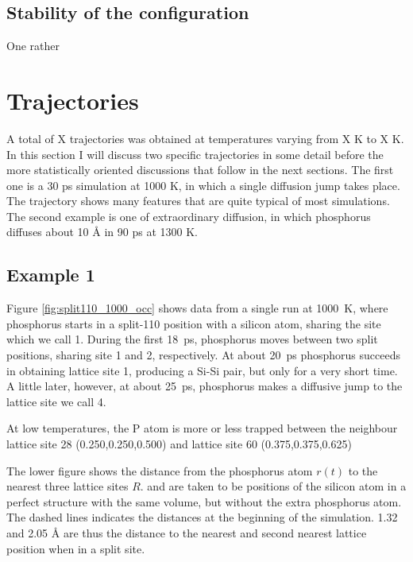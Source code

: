 \documentclass[11pt,bibliography=totoc,index=totoc]{scrbook}   %
\begin{document}
\subsection{Stability of the  configuration}

One rather 




\section{Trajectories}



A total of X trajectories was obtained at temperatures varying from X K to X K. 
In this section I will discuss two specific trajectories in some detail before the more statistically oriented discussions that follow in the next sections.
The first one is a 30 ps simulation at 1000 K, in which a single diffusion jump takes place. 
The trajectory shows many features that are quite typical of most simulations.
The second example is one of extraordinary diffusion, in which phosphorus diffuses about 10 Å in 90 ps at 1300 K.

\subsection{Example 1}

Figure \ref{fig:split110_1000_occ} shows data from a single run at 1000~K,
where phosphorus starts in a split-110 position with a silicon atom, sharing the site which we call 1. During the first 18~ps, phosphorus moves between two split positions, sharing site 1 and 2, respectively. At about 20~ps phosphorus succeeds in obtaining lattice site 1, producing a Si-Si pair, but only for a very short time. A little later, however, at about 25~ps, phosphorus makes a diffusive jump to the lattice site we call 4. 

At low temperatures, the P atom is more or less trapped between the neighbour lattice site 28 (0.250,0.250,0.500) and lattice site 60 (0.375,0.375,0.625)

  The lower figure shows the distance from the phosphorus atom $r(t)$ to the nearest three lattice sites $R$.
  and are taken to be positions of the silicon atom in a perfect structure with the same volume, but without the extra phosphorus atom.
  The dashed lines indicates the distances at the beginning of the simulation. 1.32 and 2.05 Å are thus the distance to the nearest
  and second nearest lattice position when in a split site.
\end{document}
